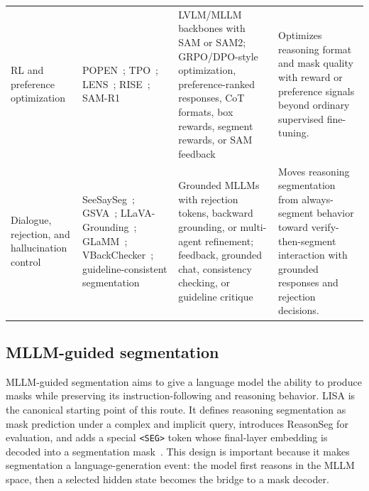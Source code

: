 \begin{table}[t]
\begin{tabularx}{\textwidth}{>{\raggedright\arraybackslash}p{}>{\raggedright\arraybackslash}X>{\raggedright\arraybackslash}p{}>{\raggedright\arraybackslash}p{}}
RL and preference optimization & POPEN~\citep{zhuPopenPreferencebasedOptimization2025}; TPO~\citep{yanTaskPreferenceOptimization2025}; LENS~\citep{zhuLensLearningSegment2026}; RISE~\citep{zhouReasoningImplicitSelfsupervised2026}; SAM-R1~\citep{huangSamr1LeveragingSam2026} & LVLM/MLLM backbones with SAM or SAM2; GRPO/DPO-style optimization, preference-ranked responses, CoT formats, box rewards, segment rewards, or SAM feedback & Optimizes reasoning format and mask quality with reward or preference signals beyond ordinary supervised fine-tuning. \\
Dialogue, rejection, and hallucination control & SeeSaySeg~\citep{wuSeeSaySegment2024}; GSVA~\citep{xiaGsvaGeneralizedSegmentation2024}; LLaVA-Grounding~\citep{zhangLlavagroundingGroundedVisual2024}; GLaMM~\citep{rasheedGlammPixelGrounding2024}; VBackChecker~\citep{guoSeeingBelievingRichContext2026}; guideline-consistent segmentation~\citep{vvatsGuidelineConsistentSegmentationMultiAgent2026} & Grounded MLLMs with rejection tokens, backward grounding, or multi-agent refinement; feedback, grounded chat, consistency checking, or guideline critique & Moves reasoning segmentation from always-segment behavior toward verify-then-segment interaction with grounded responses and rejection decisions. \\
\bottomrule
\end{tabularx}
\end{table}

\subsection{MLLM-guided segmentation}

MLLM-guided segmentation aims to give a language model the ability to produce masks while preserving its instruction-following and reasoning behavior. LISA is the canonical starting point of this route. It defines reasoning segmentation as mask prediction under a complex and implicit query, introduces ReasonSeg for evaluation, and adds a special \texttt{<SEG>} token whose final-layer embedding is decoded into a segmentation mask~\citep{xlaiLisaReasoningSegmentation2024}. This design is important because it makes segmentation a language-generation event: the model first reasons in the MLLM space, then a selected hidden state becomes the bridge to a mask decoder.


